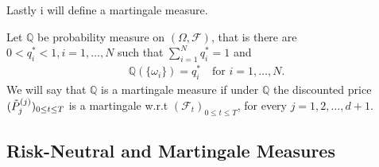 \documentclass{beamer}
\numberwithin{equation}{section}
\begin{document}
\begin{frame}\frametitle{{\normalsize \secname} \\ {\large \subsecname}}
    Lastly i will define a martingale measure.
    \begin{definition}
        Let $\mathbb{Q}$ be probability measure on $(\Omega, \mathscr{F})$, that is there are $0 < q^*_i < 1, i = 1, \ldots, N$ such that $\sum_{i=1}^N q^*_i = 1$ and
        \begin{align}
            \mathbb{Q}(\{ \omega_i \}) = q^*_i \quad \text{for } i = 1, \ldots, N.
        \end{align}
        We will say that $\mathbb{Q}$ is a martingale measure if under $\mathbb{Q}$ the discounted price $(\Tilde{P}_j^{(j)})_{0 \leq t \leq T}$ is a martingale w.r.t $(\mathscr{F}_t)_{0 \leq t \leq T}$, for every $j = 1,2, \ldots, d+1$.
    \end{definition}
\end{frame}

\subsection{Risk-Neutral and Martingale Measures}
\end{document}
